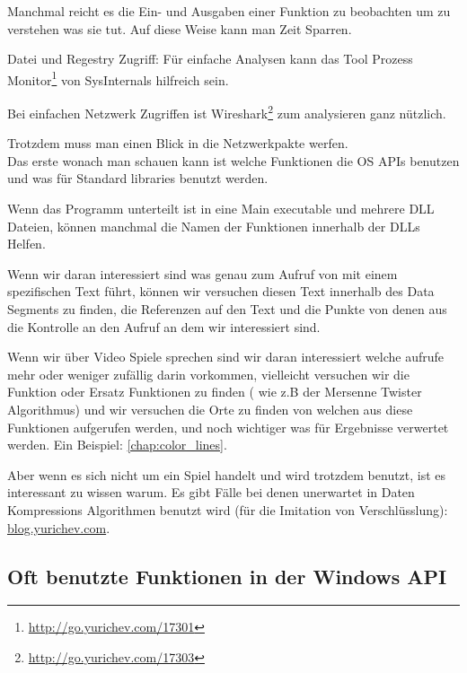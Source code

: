 
Manchmal reicht es die Ein- und Ausgaben einer Funktion zu beobachten um zu verstehen was sie tut.
Auf diese Weise kann man Zeit Sparren.

Datei und Regestry Zugriff:
F\"ur einfache Analysen kann das Tool Prozess Monitor\footnote{\url{http://go.yurichev.com/17301}}
von SysInternals hilfreich sein.

Bei einfachen Netzwerk Zugriffen ist Wireshark\footnote{\url{http://go.yurichev.com/17303}} zum analysieren ganz n\"utzlich.

Trotzdem muss man einen Blick in die Netzwerkpakte werfen.
\\
Das erste wonach man schauen kann ist welche Funktionen die \ac{OS} \ac{API}s benutzen und was f\"ur Standard libraries
benutzt werden. 

Wenn das Programm unterteilt ist in eine Main executable und mehrere DLL Dateien, k\"onnen manchmal die Namen der Funktionen innerhalb
der DLLs Helfen. 

Wenn wir daran interessiert sind was genau zum Aufruf von  mit einem spezifischen Text f\"uhrt,
k\"onnen wir versuchen diesen Text innerhalb des Data Segments zu finden, die Referenzen auf den Text und die 
Punkte von denen aus die Kontrolle an den  Aufruf an dem wir interessiert sind. %

Wenn wir \"uber Video Spiele sprechen sind wir daran interessiert welche \rand aufrufe mehr oder weniger zuf\"allig darin vorkommen,
vielleicht versuchen wir die \rand Funktion oder Ersatz Funktionen zu finden ( wie z.B der Mersenne Twister Algorithmus) 
und wir versuchen die Orte zu finden von welchen aus diese Funktionen aufgerufen werden, und noch wichtiger was f\"ur
Ergebnisse verwertet werden. 
Ein Beispiel: \ref{chap:color_lines}.

Aber wenn es sich nicht um ein Spiel handelt und \rand wird trotzdem benutzt, ist es interessant zu wissen warum.
Es gibt F\"alle bei denen unerwartet \rand in Daten Kompressions Algorithmen benutzt wird (f\"ur die Imitation von Verschl\"usslung):
\href{http://go.yurichev.com/17221}{blog.yurichev.com}.

\subsection{Oft benutzte Funktionen in der Windows API}

